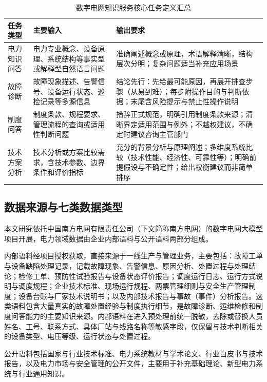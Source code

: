 \documentclass[fontset=fandol,type=master,campus=shenzhen,etitleauto=true]{hithesisbook}
\begin{document}
\begin{table}[htbp]
\centering
\caption{数字电网知识服务核心任务定义汇总}
\label{tab:task-def}
\small
\begin{tabular}{p{2.5cm}p{4.5cm}p{6.0cm}}
\toprule
\textbf{任务类型} & \textbf{主要输入} & \textbf{输出要求} \\
\midrule
电力知识问答 & 电力专业概念、设备原理、系统结构等事实型或解释型自然语言问题 & 准确阐述概念或原理，术语解释清晰，结构层次分明；复杂问题适当补充应用场景 \\
\addlinespace
故障诊断 & 故障现象描述、告警信号、设备运行状态、巡检记录等多源信息 & 结论先行：先给最可能原因，再展开排查步骤（从易到难）；每步附操作目的与判断依据；末尾含风险提示与禁止性操作说明 \\
\addlinespace
制度问答 & 制度条款、规程要求、管理流程的查询或适用性判断问题 & 措辞正式规范，明确引用制度条款来源；清晰界定适用范围与例外；不越权建议，不确定时建议咨询主管部门 \\
\addlinespace
技术方案分析 & 技术分析或方案比较需求，含技术参数、边界条件和评价指标 & 充分的背景分析与原理阐述；多维度系统比较（技术性能、经济性、可靠性等）；明确前提假设与不确定性；给出权衡建议而非简单排序 \\
\bottomrule
\end{tabular}
\end{table}

\subsection{数据来源与七类数据类型}\label{ux6570ux636eux6765ux6e90ux4e0eux4e03ux7c7bux6570ux636eux7c7bux578b}

本文研究依托中国南方电网有限责任公司（下文简称南方电网）的数字电网大模型项目开展，电力领域数据由企业内部语料与公开语料两部分组成。

内部语料经项目授权获取，直接来源于一线生产与管理业务，主要包括：故障工单与设备缺陷处理记录，记载故障现象、告警信息、原因分析、处置过程与处理结论；检修工单、预防性试验报告与设备状态评价报告；调度运行日志、运行方式说明与调度规程；企业技术标准、现场运行规程、两票管理细则与安全生产管理制度；设备台账与厂家技术说明书；以及内部技术报告与事故（事件）分析报告。这类语料包含大量真实的故障处置经验与制度执行细节，是故障诊断、运维检修和制度问答能力的主要知识来源。内部语料在进入预处理前统一脱敏，去除或替换人员姓名、工号、联系方式、具体厂站与线路名称等敏感字段，仅保留与技术判断相关的设备类型、电压等级、运行状态与处置过程。

公开语料包括国家与行业技术标准、电力系统教材与学术论文、行业白皮书与技术报告，以及电力市场与安全管理的公开文件，主要用于补充基础理论、新型电力系统与行业通用知识。
\end{document}

